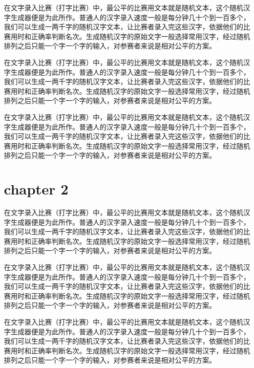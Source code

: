 \documentclass[12pt,hyperref,UTF8]{ctexbook}
\begin{document}
在文字录入比赛（打字比赛）中，最公平的比赛用文本就是随机文本，这个随机汉字生成器便是为此所作。普通人的汉字录入速度一般是每分钟几十个到一百多个，我们可以生成一两千字的随机汉字文本，让比赛者录入完这些汉字，依据他们的比赛用时和正确率判断名次。生成随机汉字的原始文字一般选择常用汉字，经过随机排列之后只能一个字一个字的输入，对参赛者来说是相对公平的方案。


在文字录入比赛（打字比赛）中，最公平的比赛用文本就是随机文本，这个随机汉字生成器便是为此所作。普通人的汉字录入速度一般是每分钟几十个到一百多个，我们可以生成一两千字的随机汉字文本，让比赛者录入完这些汉字，依据他们的比赛用时和正确率判断名次。生成随机汉字的原始文字一般选择常用汉字，经过随机排列之后只能一个字一个字的输入，对参赛者来说是相对公平的方案。

在文字录入比赛（打字比赛）中，最公平的比赛用文本就是随机文本，这个随机汉字生成器便是为此所作。普通人的汉字录入速度一般是每分钟几十个到一百多个，我们可以生成一两千字的随机汉字文本，让比赛者录入完这些汉字，依据他们的比赛用时和正确率判断名次。生成随机汉字的原始文字一般选择常用汉字，经过随机排列之后只能一个字一个字的输入，对参赛者来说是相对公平的方案。


\cleardoublepage
\chapter{chapter 2}



在文字录入比赛（打字比赛）中，最公平的比赛用文本就是随机文本，这个随机汉字生成器便是为此所作。普通人的汉字录入速度一般是每分钟几十个到一百多个，我们可以生成一两千字的随机汉字文本，让比赛者录入完这些汉字，依据他们的比赛用时和正确率判断名次。生成随机汉字的原始文字一般选择常用汉字，经过随机排列之后只能一个字一个字的输入，对参赛者来说是相对公平的方案。

在文字录入比赛（打字比赛）中，最公平的比赛用文本就是随机文本，这个随机汉字生成器便是为此所作。普通人的汉字录入速度一般是每分钟几十个到一百多个，我们可以生成一两千字的随机汉字文本，让比赛者录入完这些汉字，依据他们的比赛用时和正确率判断名次。生成随机汉字的原始文字一般选择常用汉字，经过随机排列之后只能一个字一个字的输入，对参赛者来说是相对公平的方案。

在文字录入比赛（打字比赛）中，最公平的比赛用文本就是随机文本，这个随机汉字生成器便是为此所作。普通人的汉字录入速度一般是每分钟几十个到一百多个，我们可以生成一两千字的随机汉字文本，让比赛者录入完这些汉字，依据他们的比赛用时和正确率判断名次。生成随机汉字的原始文字一般选择常用汉字，经过随机排列之后只能一个字一个字的输入，对参赛者来说是相对公平的方案。
\end{document}
